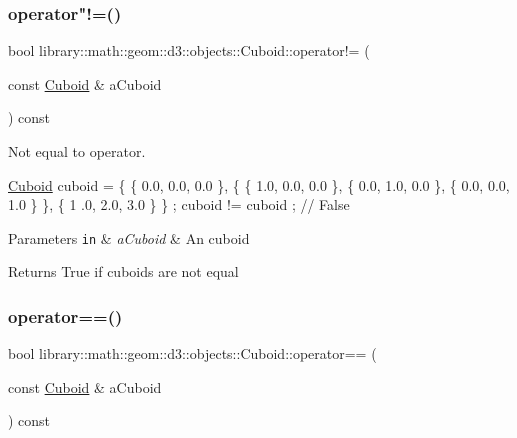 \subsubsection{\texorpdfstring{operator"!=()}{operator!=()}}
{\footnotesize\ttfamily bool library\+::math\+::geom\+::d3\+::objects\+::\+Cuboid\+::operator!= (\begin{DoxyParamCaption}\item[{const \hyperlink{classlibrary_1_1math_1_1geom_1_1d3_1_1objects_1_1_cuboid}{Cuboid} \&}]{a\+Cuboid }\end{DoxyParamCaption}) const}



Not equal to operator. 


\begin{DoxyCode}
\hyperlink{classlibrary_1_1math_1_1geom_1_1d3_1_1objects_1_1_cuboid_ac42299f962fab284a76a46d4ea4e6fa2}{Cuboid} cuboid = \{ \{ 0.0, 0.0, 0.0 \}, \{ \{ 1.0, 0.0, 0.0 \}, \{ 0.0, 1.0, 0.0 \}, \{ 0.0, 0.0, 1.0 \} \}, \{ 1
      .0, 2.0, 3.0 \} \} ;
cuboid != cuboid ; \textcolor{comment}{// False}
\end{DoxyCode}



\begin{DoxyParams}[1]{Parameters}
\mbox{\tt in}  & {\em a\+Cuboid} & An cuboid \\
\hline
\end{DoxyParams}
\begin{DoxyReturn}{Returns}
True if cuboids are not equal 
\end{DoxyReturn}
\mbox{\label{classlibrary_1_1math_1_1geom_1_1d3_1_1objects_1_1_cuboid_ae458fddf898e938729f41d645f64cd34}} 
\subsubsection{\texorpdfstring{operator==()}{operator==()}}
{\footnotesize\ttfamily bool library\+::math\+::geom\+::d3\+::objects\+::\+Cuboid\+::operator== (\begin{DoxyParamCaption}\item[{const \hyperlink{classlibrary_1_1math_1_1geom_1_1d3_1_1objects_1_1_cuboid}{Cuboid} \&}]{a\+Cuboid }\end{DoxyParamCaption}) const}



